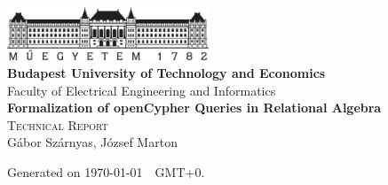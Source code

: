 \begin{titlepage}
	\begin{center}
		\includegraphics[width=60mm,keepaspectratio]{figures/bme-logo}\\
		\vspace{0.3cm}
		\textbf{Budapest University of Technology and Economics}\\
		\textmd{Faculty of Electrical Engineering and Informatics}\\[5cm]
		
		\vspace{0.4cm}
		{\huge \bfseries Formalization of openCypher Queries in Relational Algebra}\\[0.8cm]
		\vspace{0.5cm}
		\textsc{\Large Technical Report}\\[4cm]
		
		{\Large Gábor Szárnyas, József Marton}\\

		
		\vfill
		{\large Generated on \yyyymmdddate \today~\currenttime~GMT+0.}\\[0.5cm]
		
	\end{center}		
\end{titlepage}

\addtocounter{page}{1}
